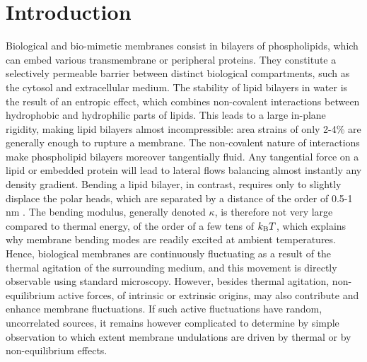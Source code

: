 \documentclass[graybox]{svmult}
\begin{document}
\section{Introduction}
Biological and bio-mimetic membranes consist in bilayers of phospholipids, which can embed various transmembrane or peripheral proteins. They constitute a selectively permeable barrier between distinct biological compartments, such as the cytosol and extracellular medium. The stability of lipid bilayers in water is the result of an entropic effect, which combines non-covalent interactions between hydrophobic and hydrophilic parts of lipids. This leads to a large in-plane rigidity, making lipid bilayers almost incompressible: area strains of only 2-4\% are generally enough to rupture a membrane. The non-covalent nature of interactions make phospholipid bilayers moreover tangentially fluid. Any tangential force on a lipid or embedded protein will lead to lateral flows balancing almost instantly any density gradient. Bending a lipid bilayer, in contrast, requires only to slightly displace the polar heads, which are separated by a distance of the order of 0.5-1 nm \cite{Campelo:2014, Hochmuth:1983}. The bending modulus, generally denoted $\kappa$, is therefore not very large compared to thermal energy, of the order of a few tens of $k_{\rm{B}}T$, which explains why membrane bending modes are readily excited at ambient temperatures. Hence, biological membranes are continuously fluctuating as a result of the thermal agitation of the surrounding medium, and this movement is directly observable using standard microscopy. However, besides thermal agitation, non-equilibrium active forces, of intrinsic or extrinsic origins, may also contribute and enhance membrane fluctuations. If such active fluctuations have random, uncorrelated sources, it remains however complicated to determine by simple observation to which extent membrane undulations are driven by thermal or by non-equilibrium effects. 
\end{document}
